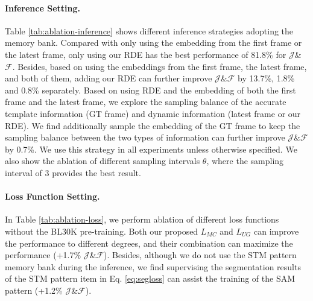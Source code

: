 \documentclass[10pt,twocolumn,letterpaper]{article}
\begin{document}
\paragraph{Inference Setting.}
\label{sec:ablation-inference}
Table \ref{tab:ablation-inference} shows different inference strategies adopting the memory bank. Compared with only using the embedding from the first frame or the latest frame, only using our RDE has the best performance of 81.8\% for {$\mathcal{J}$\&$\mathcal{F}$}. Besides, based on using the embeddings from the first frame, the latest frame, and both of them, adding our RDE can further improve  {$\mathcal{J}$\&$\mathcal{F}$} by 13.7\%, 1.8\% and 0.8\% separately.  Based on using RDE and the embedding of both the first frame and the latest frame, we explore the sampling balance of the accurate template information (GT frame) and dynamic information (latest frame or our RDE).  We find additionally sample the embedding of the GT frame to keep the sampling balance between the two types of information can further improve  {$\mathcal{J}$\&$\mathcal{F}$} by 0.7\%. We use this strategy in all experiments unless otherwise specified.
We also show the ablation of different sampling intervals $\theta$, where the sampling interval of 3 provides the best result.
\vspace{-0.5em}
\paragraph{Loss Function Setting.}
In Table \ref{tab:ablation-loss}, we perform ablation of different loss functions without the BL30K \cite{cheng2021modular} pre-training. Both our proposed $L_{MC}$ and $L_{UG}$  can improve the performance to different degrees, and their combination can maximize the performance (+1.7\% {$\mathcal{J}$\&$\mathcal{F}$}). Besides, although we do not use the STM pattern memory bank during the inference, we find supervising the segmentation results of the STM pattern item  in Eq. \ref{eq:segloss} can assist the training of the SAM pattern (+1.2\%  {$\mathcal{J}$\&$\mathcal{F}$}). 
\end{document}
